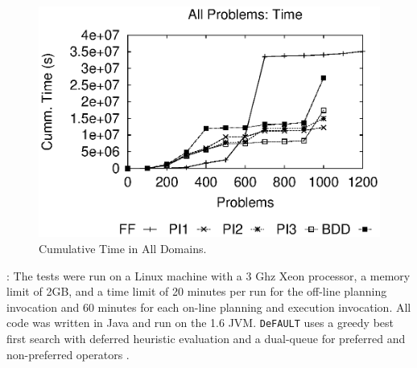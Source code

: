 \documentclass[letterpaper]{article}
\def\und#1{\noindent{\bf #1}:}
\def\FFRISKY{{\tt DeFAULT}}
\def\citep#1{\cite{#1}}
\begin{document}
\begin{figure}\centering
\includegraphics[width=\linewidth]{WeberBryceICAPS11Fig2.eps}
\caption{\label{fig:alltotaltime}Cumulative Time  in  All Domains.}
\end{figure} 
   

\und{Test Setup} The tests were run on a Linux machine with a 3 Ghz Xeon
processor, a memory limit of 2GB, and a time limit of 20 minutes per run for the
off-line planning invocation and 60 minutes for each on-line planning and
execution invocation.  All code was written in Java and run on the 1.6 JVM. 
\FFRISKY{} uses a greedy best first search with deferred heuristic evaluation
and a dual-queue for preferred and non-preferred operators
\citep{DBLP:journals/jair/Helmert06}.  


\end{document}
